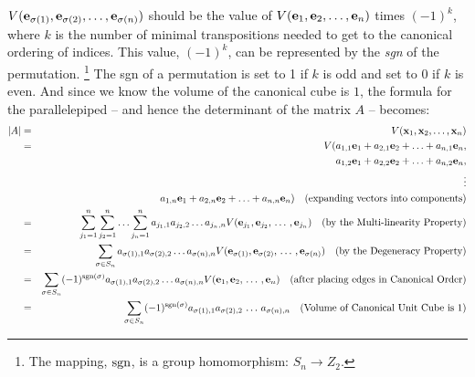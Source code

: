 \documentclass{article}
\begin{document}
$V({\bf e}_{\sigma(1)}, {\bf e}_{\sigma(2)}, \ldots, {\bf e}_{\sigma(n)})$ should be
the value of $V({\bf e}_1, {\bf e}_2, \ldots, {\bf e}_n)$ times $(-1)^k$, where
$k$ is the number of minimal transpositions needed to get to the canonical ordering of
indices. This value, $(-1)^k$, can be represented by the {\em sgn\/}
of the permutation.%
\footnote{The mapping, ${\rm sgn\/}$, is a group homomorphism: $S_n \rightarrow Z_2$.}
The sgn of a permutation is set to 1 if $k$ is odd and set to 0
if $k$ is even. And since we know the volume of the canonical cube is $1$,
the formula for the parallelepiped -- and hence the
determinant of the matrix $A$ -- becomes:
\begin{eqnarray}
  |A| & = & V({\bf x}_1, {\bf x}_2, \ldots, {\bf x}_n) \nonumber \\
  & = & V(a_{1, 1} {\bf e}_1 + a_{2, 1} {\bf e}_2 + \ldots + a_{n,1}{\bf e}_n, \nonumber \\
      & \hphantom{=} & \hphantom{V(}a_{1, 2} {\bf e}_1 + a_{2, 2} {\bf e}_2
                       + \ldots + a_{n,2}{\bf e}_n, \nonumber \\
      & \hphantom{=} & \hphantom{V(} \vdots \nonumber \\
      & \hphantom{=} & \hphantom{V(} a_{1, n} {\bf e}_1 + a_{2, n} {\bf e}_2
                       + \ldots + a_{n,n}{\bf e}_n)
                       \nonumber \quad
                       \text{(expanding vectors into components)} \nonumber \\   
      & = & \sum_{j_1=1}^n \sum_{j_2=1}^n \ldots \sum_{j_n=1}^n 
            a_{j_1,1} a_{j_2, 2} \ldots a_{j_n, n}
            V({\bf e}_{j_1}, {\bf e}_{j_2}, \, \ldots \, , {\bf e}_{j_n}) 
            \quad \text{(by the Multi-linearity Property)} \nonumber \\
  & = & \sum_{\sigma \in S_n} a_{\sigma(1), 1} a_{\sigma(2),2} \ldots a_{\sigma(n), n}
        V({\bf e}_{\sigma(1)}, {\bf e}_{\sigma(2)}, \, \ldots \, , {\bf e}_{\sigma(n)})
        \quad \text{(by the Degeneracy Property)} \nonumber \\
      & = & \sum_{\sigma \in S_n} (-1)^{{\rm sgn}(\sigma)}
            a_{\sigma(1), 1} a_{\sigma(2),2} \ldots a_{\sigma(n), n}
        V({\bf e}_{1}, {\bf e}_{2}, \, \ldots \, , {\bf e}_{n})
        \quad \text{(after placing edges in Canonical Order)}\nonumber \\
      & = & \sum_{\sigma \in S_n} (-1)^{{\rm sgn}(\sigma)}
            a_{\sigma(1), 1} a_{\sigma(2),2} \, \ldots \, a_{\sigma(n), n} \quad
        \text{(Volume of Canonical Unit Cube is $1$)}
\end{eqnarray}
\end{document}
